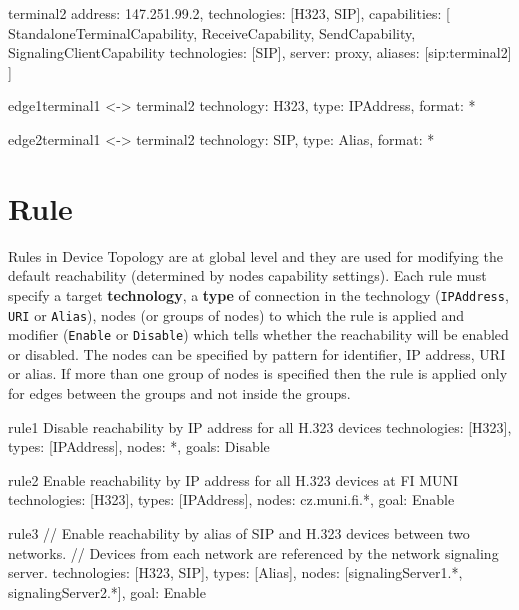 \begin{ResourceExample}{}{terminal2}{}
address: 147.251.99.2,
technologies: [H323, SIP],
capabilities: [
  StandaloneTerminalCapability,
  ReceiveCapability,
  SendCapability,
  SignalingClientCapability {technologies: [SIP], server: proxy, 
    aliases: [sip:terminal2]}
]
\end{ResourceExample}

\begin{ResourceExample}{}{edge1}{terminal1 <-> terminal2}
technology: H323,
type: IPAddress,
format: *
\end{ResourceExample}

\begin{ResourceExample}{}{edge2}{terminal1 <-> terminal2}
technology: SIP,
type: Alias,
format: *
\end{ResourceExample} 
  
  
\section{Rule}
Rules in Device Topology are at global level and they are used for modifying 
the default reachability (determined by nodes capability settings). Each rule 
must specify a target \textbf{technology}, a \textbf{type} of connection in 
the technology (\verb|IPAddress|, \verb|URI| or \verb|Alias|), 
nodes (or groups of nodes) 
to which the rule is applied and modifier (\verb|Enable| or \verb|Disable|) 
which tells whether the reachability will be enabled or disabled. The nodes 
can be specified by pattern for identifier, IP address, URI or alias. If more than 
one group of nodes is specified then the rule is applied only for edges 
between the groups and not inside the groups.

\begin{ResourceExample}{}{rule1}%
      {Disable reachability by IP address for all H.323 devices}
technologies: [H323],
types: [IPAddress],
nodes: *,
goals: Disable
\end{ResourceExample}

\begin{ResourceExample}{}{rule2}%
      {Enable reachability by IP address for all H.323 devices at FI MUNI}
technologies: [H323],
types: [IPAddress],
nodes: cz.muni.fi.*,
goal: Enable
\end{ResourceExample}

\begin{ResourceExample}{}{rule3}{}
// Enable reachability by alias of SIP and H.323 devices between two networks.
// Devices from each network are referenced by the network signaling server.
technologies: [H323, SIP],
types: [Alias],
nodes: [signalingServer1.*, signalingServer2.*],
goal: Enable
\end{ResourceExample}

